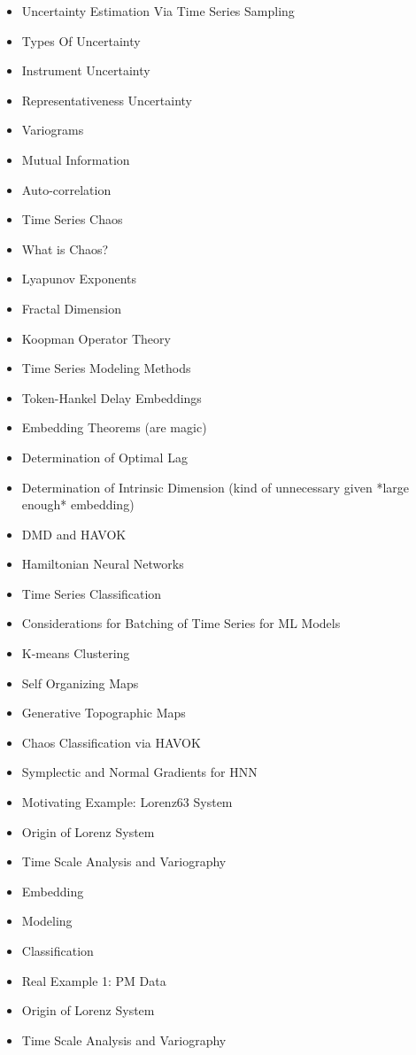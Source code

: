\begin{itemize}
\item Uncertainty Estimation Via Time Series Sampling
\item Types Of Uncertainty
\item Instrument Uncertainty
\item Representativeness Uncertainty
\item Variograms
\item Mutual Information
\item Auto-correlation
\item Time Series Chaos
\item What is Chaos?
\item Lyapunov Exponents
\item Fractal Dimension
\item Koopman Operator Theory
\item Time Series Modeling Methods
\item Token-Hankel Delay Embeddings
\item Embedding Theorems (are magic)
\item Determination of Optimal Lag
\item Determination of Intrinsic Dimension (kind of unnecessary given *large enough* embedding)
\item DMD and HAVOK
\item Hamiltonian Neural Networks
\item Time Series Classification
\item Considerations for Batching of Time Series for ML Models
\item K-means Clustering
\item Self Organizing Maps
\item Generative Topographic Maps
\item Chaos Classification via HAVOK
\item Symplectic and Normal Gradients for HNN
\item Motivating Example: Lorenz63 System
\item Origin of Lorenz System
\item Time Scale Analysis and Variography
\item Embedding
\item Modeling
\item Classification
\item Real Example 1: PM Data
\item Origin of Lorenz System
\item Time Scale Analysis and Variography

\end{itemize}

